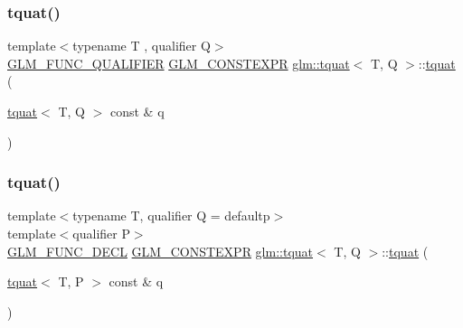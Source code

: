\mbox{\label{structglm_1_1tquat_a2711d3970e6aeeade71debf8a9b5c012}} 
\subsubsection{\texorpdfstring{tquat()}{tquat()}\hspace{0.1cm}{\footnotesize\ttfamily [2/12]}}
{\footnotesize\ttfamily template$<$typename T , qualifier Q$>$ \\
\hyperlink{setup_8hpp_a33fdea6f91c5f834105f7415e2a64407}{G\+L\+M\+\_\+\+F\+U\+N\+C\+\_\+\+Q\+U\+A\+L\+I\+F\+I\+ER} \hyperlink{setup_8hpp_a08b807947b47031d3a511f03f89645ad}{G\+L\+M\+\_\+\+C\+O\+N\+S\+T\+E\+X\+PR} \hyperlink{structglm_1_1tquat}{glm\+::tquat}$<$ T, Q $>$\+::\hyperlink{structglm_1_1tquat}{tquat} (\begin{DoxyParamCaption}\item[{\hyperlink{structglm_1_1tquat}{tquat}$<$ T, Q $>$ const \&}]{q }\end{DoxyParamCaption})}

\mbox{\label{structglm_1_1tquat_ac6d649e6c91a6bdcf324f870010a81bb}} 
\subsubsection{\texorpdfstring{tquat()}{tquat()}\hspace{0.1cm}{\footnotesize\ttfamily [3/12]}}
{\footnotesize\ttfamily template$<$typename T, qualifier Q = defaultp$>$ \\
template$<$qualifier P$>$ \\
\hyperlink{setup_8hpp_ab2d052de21a70539923e9bcbf6e83a51}{G\+L\+M\+\_\+\+F\+U\+N\+C\+\_\+\+D\+E\+CL} \hyperlink{setup_8hpp_a08b807947b47031d3a511f03f89645ad}{G\+L\+M\+\_\+\+C\+O\+N\+S\+T\+E\+X\+PR} \hyperlink{structglm_1_1tquat}{glm\+::tquat}$<$ T, Q $>$\+::\hyperlink{structglm_1_1tquat}{tquat} (\begin{DoxyParamCaption}\item[{\hyperlink{structglm_1_1tquat}{tquat}$<$ T, P $>$ const \&}]{q }\end{DoxyParamCaption})}

\mbox{\label{structglm_1_1tquat_a5abf4c68775ef307edb54e7e0bdf85ca}} 
